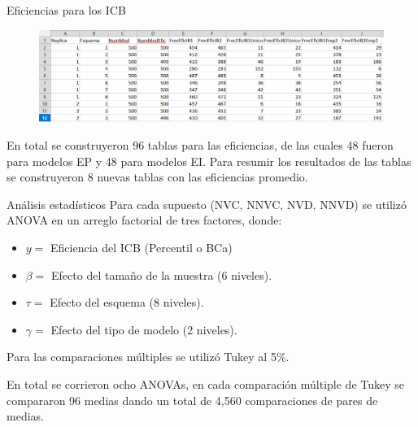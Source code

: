 \documentclass[serif, aspectratio=169]{beamer}
\begin{document}
\begin{frame}{Eficiencias para los ICB }
	
	\begin{figure}[ht!]
		\centering 
		\includegraphics[width=0.9\linewidth]{recurso/tabla_eficiencia_intervalo.png} 
		\label{fig:tablaEficInt}
	\end{figure}
	
	
En total se construyeron 96 tablas para las eficiencias, de las cuales 48 fueron para modelos EP y 48 para modelos EI. Para resumir los resultados de las tablas se construyeron 8 nuevas tablas con las eficiencias promedio.
\end{frame}






\begin{frame}{Análisis estadísticos}
	Para cada supuesto (NVC, NNVC, NVD, NNVD) se utilizó ANOVA en un arreglo factorial de tres factores, donde: \\
	
	\begin{itemize}
		\item 	$y = $ Eficiencia del ICB (Percentil o BCa)
	
		\item 	$ \beta=$  Efecto del tamaño de la muestra (6 niveles).
	
		\item 	$ \tau=$ Efecto del esquema (8 niveles).
	
		\item 	$ \gamma=$ Efecto del tipo de modelo (2 niveles).
	\end{itemize}
	
	Para las comparaciones múltiples se utilizó Tukey al 5\%.
	\vspace{.3cm}
	
	
	En total se corrieron ocho ANOVAs, en cada comparación múltiple de Tukey se compararon 96 medias dando un total de 4,560 comparaciones de pares de medias.
\end{frame}



\end{document}
